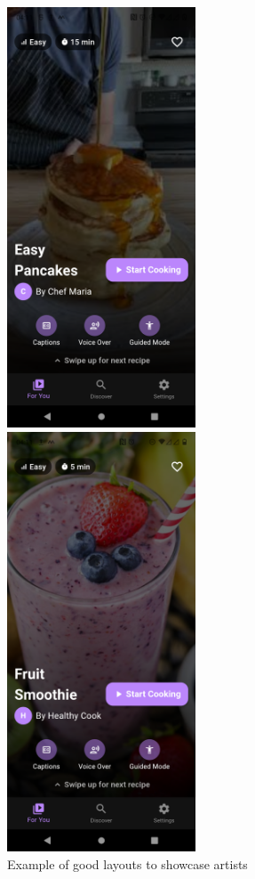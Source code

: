 \documentclass[]{project_final}
\begin{document}
\begin{figure}[ht!]
    \centering
    \begin{minipage}[t]{0.4\textwidth}
        \includegraphics[width=0.5\textwidth]{fyp1.png}
    \end{minipage}
    \hfill
    \begin{minipage}[t]{0.4\textwidth}
        \includegraphics[width=0.5\textwidth]{fyp2.png}
    \end{minipage}
    \caption{Example of good layouts to showcase artists}
    \label{fig:1}
\end{figure}
\end{document}
